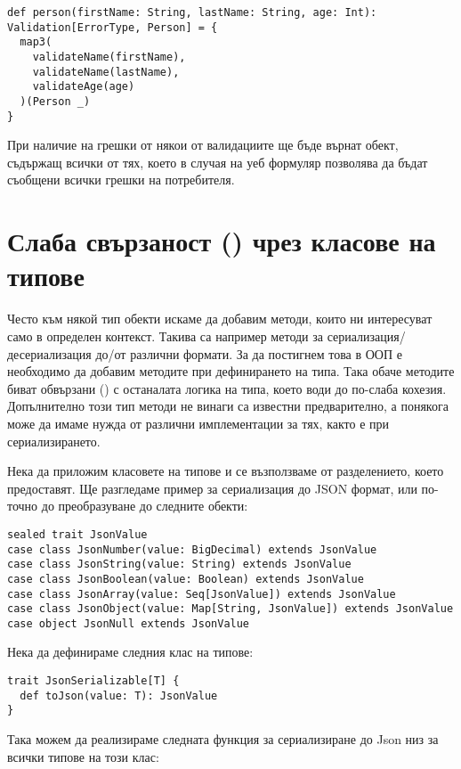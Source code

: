 \begin{lstlisting}
def person(firstName: String, lastName: String, age: Int): Validation[ErrorType, Person] = {
  map3(
    validateName(firstName),
    validateName(lastName),
    validateAge(age)
  )(Person _)
}
\end{lstlisting}

При наличие на грешки от някои от валидациите ще бъде върнат  обект, съдържащ всички от тях, което в случая на уеб формуляр позволява да бъдат съобщени всички грешки на потребителя.

\section{Слаба свързаност () чрез класове на типове}

Често към някой тип обекти искаме да добавим методи, които ни интересуват само в определен контекст. Такива са например методи за сериализация/десериализация до/от различни формати. За да постигнем това в ООП е необходимо да добавим методите при дефинирането на типа. Така обаче методите биват обвързани () с останалата логика на типа, което води до по-слаба кохезия. Допълнително този тип методи не винаги са известни предварително, а понякога може да имаме нужда от различни имплементации за тях, както е при сериализирането.

Нека да приложим класовете на типове и се възползваме от разделението, което предоставят. Ще разгледаме пример за сериализация до JSON формат, или по-точно до преобразуване до следните обекти:

\begin{lstlisting}
sealed trait JsonValue
case class JsonNumber(value: BigDecimal) extends JsonValue
case class JsonString(value: String) extends JsonValue
case class JsonBoolean(value: Boolean) extends JsonValue
case class JsonArray(value: Seq[JsonValue]) extends JsonValue
case class JsonObject(value: Map[String, JsonValue]) extends JsonValue
case object JsonNull extends JsonValue
\end{lstlisting}

Нека да дефинираме следния клас на типове:

\begin{lstlisting}
trait JsonSerializable[T] {
  def toJson(value: T): JsonValue
}
\end{lstlisting}

Така можем да реализираме следната функция за сериализиране до Json низ за всички типове на този клас:

